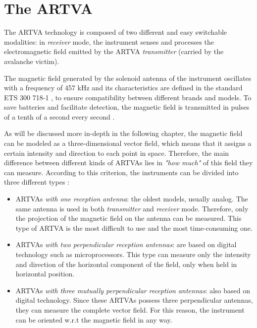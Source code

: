 \section{The ARTVA}
The ARTVA technology is composed of two different and easy switchable modalities: 
in \textit{receiver} mode, the instrument senses and processes the 
electromagnetic field emitted by the ARTVA \textit{transmitter} (carried by the 
avalanche victim).

The magnetic field generated by the solenoid antenna of the instrument oscillates 
with a frequency of 457 kHz and its characteristics are defined in the standard 
ETS 300 718-1 \cite{eu_standard}, to ensure compatibility between different 
brands and models. To save batteries and facilitate detection, the magnetic field 
is transmitted in pulses of a tenth of a second every second \cite{first-model}.

As will be discussed more in-depth in the following chapter, the magnetic field 
can be modeled as a three-dimensional vector field, which means that it assigns a 
certain intensity and direction to each point in space. Therefore, the main 
difference between different kinds of ARTVAs lies in \textit{"how much"} of this 
field they can measure. According to this criterion, the instruments can be 
divided into three different types \cite{first-model}:

\begin{itemize}
    \item ARTVAs \textit{with one reception antenna}: the oldest models, usually
    analog. The same antenna is used in both \textit{transmitter} and 
    \textit{receiver} mode. Therefore, only the projection of the magnetic field 
    on the antenna can be measured. This type of ARTVA is the most difficult to 
    use and the most time-consuming one.
    
    \item ARTVAs \textit{with two perpendicular reception antennas}: are based on 
    digital technology such as microprocessors. This type can measure only the 
    intensity and direction of the horizontal component of the field, only when 
    held in horizontal position.
    
    \item ARTVAs \textit{with three mutually perpendicular reception antennas}: 
    also based on digital technology. Since these ARTVAs possess three 
    perpendicular antennas, they can measure the complete vector field. For this 
    reason, the instrument can be oriented w.r.t the magnetic field in any way.
\end{itemize}

